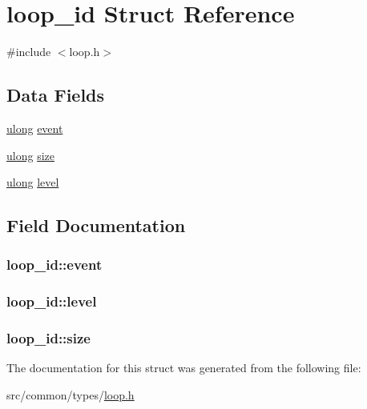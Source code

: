 \hypertarget{structloop__id}{}\section{loop\+\_\+id Struct Reference}
\label{structloop__id}


{\ttfamily \#include $<$loop.\+h$>$}

\subsection*{Data Fields}
\begin{DoxyCompactItemize}
\item 
\hyperlink{generic_8h_a718b4eb2652c286f4d42dc18a8e71a1a}{ulong} \hyperlink{structloop__id_ae48ef08a72c666e6e087678c398975f0}{event}
\item 
\hyperlink{generic_8h_a718b4eb2652c286f4d42dc18a8e71a1a}{ulong} \hyperlink{structloop__id_a71a8f0c1e671cece4d4342ea81d7b5a1}{size}
\item 
\hyperlink{generic_8h_a718b4eb2652c286f4d42dc18a8e71a1a}{ulong} \hyperlink{structloop__id_ae79984ae23a15dbd6acacc82ac65ac14}{level}
\end{DoxyCompactItemize}


\subsection{Field Documentation}
\subsubsection[{\texorpdfstring{event}{event}}]{ loop\+\_\+id\+::event}\hypertarget{structloop__id_ae48ef08a72c666e6e087678c398975f0}{}\label{structloop__id_ae48ef08a72c666e6e087678c398975f0}
\subsubsection[{\texorpdfstring{level}{level}}]{ loop\+\_\+id\+::level}\hypertarget{structloop__id_ae79984ae23a15dbd6acacc82ac65ac14}{}\label{structloop__id_ae79984ae23a15dbd6acacc82ac65ac14}
\subsubsection[{\texorpdfstring{size}{size}}]{ loop\+\_\+id\+::size}\hypertarget{structloop__id_a71a8f0c1e671cece4d4342ea81d7b5a1}{}\label{structloop__id_a71a8f0c1e671cece4d4342ea81d7b5a1}


The documentation for this struct was generated from the following file\+:\begin{DoxyCompactItemize}
\item 
src/common/types/\hyperlink{loop_8h}{loop.\+h}\end{DoxyCompactItemize}
